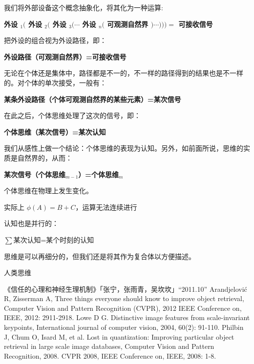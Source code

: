 \documentclass[fontset=windows, 12pt, a4paper]{article}
\begin{document}
我们将外部设备这个概念抽象化，将其化为一种运算:\par
\centerline{\textbf{
    外设 $_1($ 外设 $_2($ 外设 $_3(\cdots$
    外设 $_n($ 可观测自然界 $)\cdots)))=$
    可接收信号
}}
把外设的组合视为外设路径，即：\par
\centerline{\textbf{
    外设路径（可观测自然界）=可接收信号
}}
无论在个体还是集体中，路径都是不一的，不一样的路径得到的结果也是不一样的。对个体的单次接受，一般有：\par
\centerline{\textbf{
    某条外设路径（个体可观测自然界的某些元素）=某次信号
}}
在此之后，个体思维处理了这次的信号，即：\par
\centerline{\textbf{
    个体思维（某次信号）=某次认知
}}
我们从感性上做一个结论：个体思维的表现为认知。另外，如前面所说，思维的实质是自然界的，从而：\par
\centerline{\textbf{
    某次信号（个体思维$_{m-1}$）=个体思维$_m$
}}
个体思维在物理上发生变化。

实际上 $\phi(A)=B+C$，运算无法连续进行

认知也是并行的：\par
$\sum$某次认知=某个时刻的认知

思维是可以再细分的，但我们还是将其作为复合体以方便描述。



人类思维


\begin{thebibliography}{99}  
    《信任的心理和神经生理机制》「张宁，张雨青，吴坎坎」“2011.10” 
    Arandjelović R, Zisserman A, Three things everyone should know to improve object retrieval, Computer Vision and Pattern Recognition (CVPR), 2012 IEEE Conference on, IEEE, 2012: 2911-2918.  
    Lowe D G. Distinctive image features from scale-invariant keypoints, International journal of computer vision, 2004, 60(2): 91-110.  
    Philbin J, Chum O, Isard M, et al. Lost in quantization: Improving particular object retrieval in large scale image databases, Computer Vision and Pattern Recognition, 2008. CVPR 2008, IEEE Conference on, IEEE, 2008: 1-8.  
\end{thebibliography}

% 

\end{document}
